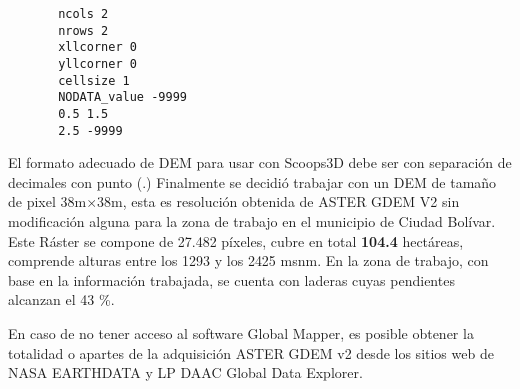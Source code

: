 \newpage
\begin{verbatim}
	   ncols 2
	   nrows 2
	   xllcorner 0
	   yllcorner 0
	   cellsize 1
	   NODATA_value -9999
	   0.5 1.5
	   2.5 -9999
\end{verbatim}


El formato adecuado de DEM para usar con Scoops3D debe ser con separaci\'{o}n de
decimales con punto (.)
Finalmente se decidi\'{o} trabajar con un DEM de tama\~no de pixel 38m$\times$38m, esta es
resoluci\'{o}n obtenida de ASTER GDEM V2 sin modificaci\'on alguna para la zona de trabajo en el municipio de Ciudad Bol\'{i}var.
Este R\'aster se compone de 27.482 p\'ixeles, cubre en total \textbf{104.4 } hect\'areas,
comprende alturas entre los 1293 y los 2425 msnm.
En la zona de trabajo, con base en la informaci\'{o}n trabajada, se cuenta con laderas cuyas
pendientes alcanzan el 43 \%.



En caso de no tener acceso al software Global Mapper, es posible obtener la totalidad o apartes  de la adquisici\'on  ASTER GDEM v2 desde los sitios web de NASA EARTHDATA y LP DAAC Global Data Explorer.